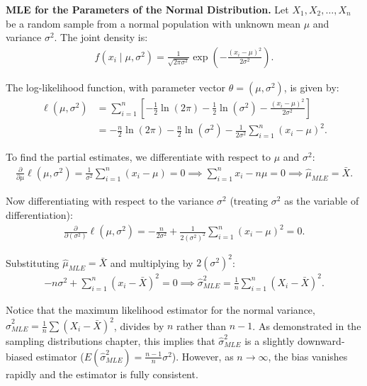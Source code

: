 \begin{ejemplo}
	\textbf{MLE for the Parameters of the Normal Distribution.}
	Let $X_1, X_2, \ldots, X_n$ be a random sample from a normal population with unknown mean $\mu$ and variance $\sigma^2$. The joint density is:
	\begin{align}
		f(x_i \mid \mu, \sigma^2) = \frac{1}{\sqrt{2\pi\sigma^2}} \exp\left( -\frac{(x_i - \mu)^2}{2\sigma^2} \right).
	\end{align}

	The log-likelihood function, with parameter vector $\theta = (\mu, \sigma^2)$, is given by:
	\begin{align}
		\ell(\mu, \sigma^2) &= \sum_{i=1}^n \left[ -\frac{1}{2}\ln(2\pi) - \frac{1}{2}\ln(\sigma^2) - \frac{(x_i - \mu)^2}{2\sigma^2} \right] \\
		&= -\frac{n}{2}\ln(2\pi) - \frac{n}{2}\ln(\sigma^2) - \frac{1}{2\sigma^2}\sum_{i=1}^n (x_i - \mu)^2.
	\end{align}

	To find the partial estimates, we differentiate with respect to $\mu$ and $\sigma^2$:
	\begin{align}
		\frac{\partial}{\partial \mu} \ell(\mu, \sigma^2) = \frac{1}{\sigma^2}\sum_{i=1}^n (x_i - \mu) = 0 \implies \sum_{i=1}^n x_i - n\mu = 0 \implies \hat{\mu}_{MLE} = \bar{X}.
	\end{align}

	Now differentiating with respect to the variance $\sigma^2$ (treating $\sigma^2$ as the variable of differentiation):
	\begin{align}
		\frac{\partial}{\partial (\sigma^2)} \ell(\mu, \sigma^2) = -\frac{n}{2\sigma^2} + \frac{1}{2(\sigma^2)^2} \sum_{i=1}^n (x_i - \mu)^2 = 0.
	\end{align}

	Substituting $\hat{\mu}_{MLE} = \bar{X}$ and multiplying by $2(\sigma^2)^2$:
	\begin{align}
		-n\sigma^2 + \sum_{i=1}^n (x_i - \bar{X})^2 = 0 \implies \hat{\sigma}^2_{MLE} = \frac{1}{n}\sum_{i=1}^n (X_i - \bar{X})^2.
	\end{align}
\end{ejemplo}

\begin{observacion}
	Notice that the maximum likelihood estimator for the normal variance, $\hat{\sigma}^2_{MLE} = \frac{1}{n}\sum (X_i - \bar{X})^2$, divides by $n$ rather than $n-1$. As demonstrated in the sampling distributions chapter, this implies that $\hat{\sigma}^2_{MLE}$ is a slightly downward-biased estimator ($E(\hat{\sigma}^2_{MLE}) = \frac{n-1}{n}\sigma^2$). However, as $n \to \infty$, the bias vanishes rapidly and the estimator is fully consistent.
\end{observacion}

